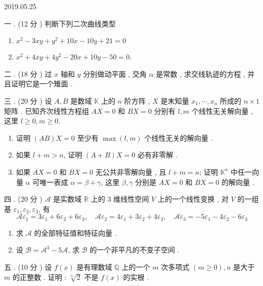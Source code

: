 \documentclass[10pt]{article}
\begin{document}
   

2019.05.25

 一 . (12  分 )  判断下列二次曲线类型 

\begin{enumerate}
  \item $x^{2}-3 x y+y^{2}+10 x-10 y+21=0$
  \item $x^{2}+4 x y+4 y^{2}-20 x+10 y-50=0$.
\end{enumerate}
 二 . (18  分 )  过  $x$  轴和  $y$  分别做动平面 ,  交角  $\alpha$  是常数 ,  求交线轨迹的方程 ,  并且证明它是一个雉面 .

 三 . (20  分 )  设  $A, B$  是数域  $\mathbb{K}$  上的  $n$  阶方阵 , $X$  是末知量  $x_{1}, \cdots, x_{n}$  所成的  $n \times 1$  矩阵 .  已知齐次线性方程组  $A X=0$  和  $B X=0$  分别有  $l, m$  个线性无关解向量 ,  这里  $l \geqslant 0, m \geqslant 0$.

\begin{enumerate}
  \item  证明  $(A B) X=0$  至少有  $\max (l, m)$  个线性无关的解向量 .

  \item  如果  $l+m>n$,  证明  $(A+B) X=0$  必有非零解 .

  \item  如果  $A X=0$  和  $B X=0$  无公共非零解向量 ,  且  $l+m=n$;  证明  $\mathbb{K}^{n}$  中任一向量  $\alpha$  可唯一表成  $\alpha=\beta+\gamma$,  这里  $\beta, \gamma$  分别是  $A X=0$  和  $B X=0$  的解向量 .

\end{enumerate}
 四 . (20  分 ) $\mathscr{A}$  是实数域  $\mathbb{R}$  上的  3  维线性空间  $V$  上的一个线性变换 ,  对  $V$  的一组基  $\varepsilon_{1}, \varepsilon_{2}, \varepsilon_{3}$,  有 
$$
\mathscr{A} \varepsilon_{1}=3 \varepsilon_{1}+6 \varepsilon_{2}+6 \varepsilon_{3}, \quad \mathscr{A} \varepsilon_{2}=4 \varepsilon_{1}+3 \varepsilon_{2}+4 \varepsilon_{3}, \quad \mathscr{A} \varepsilon_{3}=-5 \varepsilon_{1}-4 \varepsilon_{2}-6 \varepsilon_{3}
$$

\begin{enumerate}
  \item  求  $\mathscr{A}$  的全部特征值和特征向量 .

  \item  设  $\mathscr{B}=\mathscr{A}^{3}-5 \mathscr{A}$,  求  $\mathscr{B}$  的一个非平凡的不变子空间 .

\end{enumerate}
 五 . (10  分 )  设  $f(x)$  是有理数域  $\mathbb{Q}$  上的一个  $m$  次多项式  $(m \geqslant 0), n$  是大于  $m$  的正整数 .  证明 : $\sqrt[n]{2}$  不是  $f(x)$  的实根 .
\end{document}
